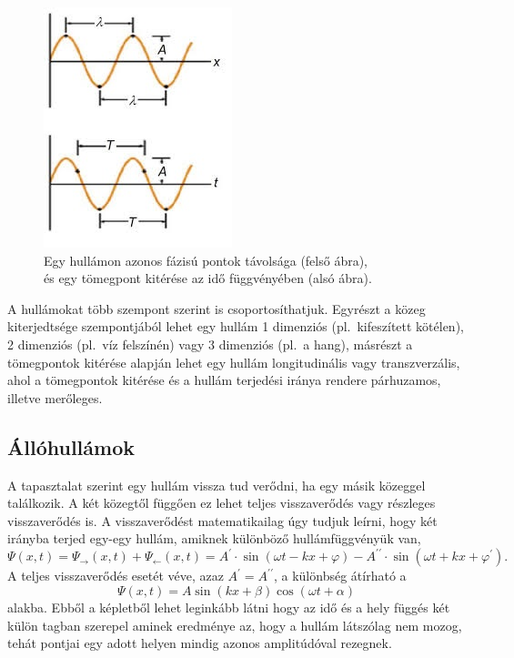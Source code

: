 \documentclass[a4paper,12pt]{article}
\begin{document}
\begin{figure}[!h]
\centering
\includegraphics[scale=1]{hull_hossz.jpg}
\caption{Egy hullámon azonos fázisú pontok távolsága (felső ábra), \\és egy tömegpont kitérése az idő függvényében (alsó ábra).}
\end{figure}

A hullámokat több szempont szerint is csoportosíthatjuk. Egyrészt a közeg kiterjedtsége szempontjából lehet egy hullám 1 dimenziós (pl.\ kifeszített kötélen), 2 dimenziós (pl.\ víz felszínén) vagy 3 dimenziós (pl.\ a hang), másrészt a tömegpontok kitérése alapján lehet egy hullám longitudinális vagy transzverzális, ahol a tömegpontok kitérése és a hullám terjedési iránya rendere párhuzamos, illetve merőleges.

\subsection{Állóhullámok}

A tapasztalat szerint egy hullám vissza tud verődni, ha egy másik közeggel találkozik. A két közegtől függően ez lehet teljes visszaverődés vagy részleges visszaverődés is. A visszaverődést matematikailag úgy tudjuk leírni, hogy két irányba terjed egy-egy hullám, amiknek különböző hullámfüggvényük van,
$$ \Psi(x, t) = \Psi_{\rightarrow}(x, t) + \Psi_{\leftarrow}(x, t) = A^\prime \cdot \sin(\omega t - k x + \varphi) - A^{\prime \prime} \cdot \sin(\omega t + k x + \varphi^\prime). $$
A teljes visszaverődés esetét véve, azaz $A^\prime = A^{\prime \prime}$, a különbség átírható a
$$ \Psi(x, t) = A \sin(k x + \beta) \cos(\omega t + \alpha) $$
alakba. Ebből a képletből lehet leginkább látni hogy az idő és a hely függés két külön tagban szerepel aminek eredménye az, hogy a hullám látszólag nem mozog, tehát pontjai egy adott helyen mindig azonos amplitúdóval rezegnek.
\end{document}
